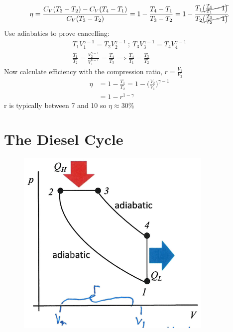 \documentclass[a4paper, 11pt, normalem]{report}
\begin{document}
\begin{equation*}
    \eta = \frac{C_V (T_3 - T_2) - C_V (T_4 - T_1)}{C_V (T_3 - T_2)} = 1 - \frac{T_4 - T_1}{T_3 - T_2} = 1 - \frac{T_1 \cancel{\big(\tfrac{T_4}{T_1} - 1\big)}}{T_2 \cancel{\big(\tfrac{T_3}{T_2} - 1\big)}}
\end{equation*}
Use adiabatics to prove cancelling:
\begin{gather*}
    T_1 V_{1}^{\gamma - 1} = T_2 V_{2}^{\gamma - 1} ~;~ T_3 V_{3}^{\gamma - 1} = T_4 V_{4}^{\gamma - 1} \\
    \frac{T_1}{T_2} = \frac{V_{2}^{\gamma - 1}}{V_{1}^{\gamma - 1}} = \frac{T_4}{T_3}  \implies \frac{T_4}{T_1} = \frac{T_3}{T_2}
\end{gather*}
Now calculate efficiency with the compression ratio, $r = \frac{V_1}{V_2}$
\begin{align*}
    \eta &= 1 - \frac{T_1}{T_2} = 1 - \Big(\frac{V_2}{V_1}\Big)^{\gamma - 1} \\
    &= 1 - r^{1 - \gamma}
\end{align*}
r is typically between 7 and 10 so $\eta \approx 30\%$

\newpage
\section{The Diesel Cycle}
\begin{figure}
    \begin{center}
        \includegraphics[scale=0.5]{Diesel.png}
        \vspace{-300pt}
    \end{center}
\end{figure}
\end{document}
